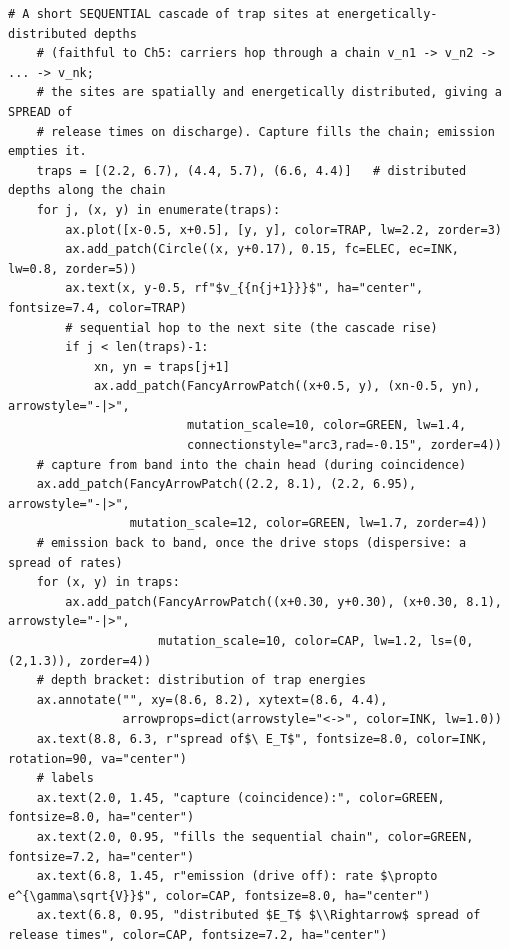 \begin{lstlisting}[caption={schematics.ipynb code cell 4},label={lst:mrl-nb-schematics-4}]
    # A short SEQUENTIAL cascade of trap sites at energetically-distributed depths
    # (faithful to Ch5: carriers hop through a chain v_n1 -> v_n2 -> ... -> v_nk;
    # the sites are spatially and energetically distributed, giving a SPREAD of
    # release times on discharge). Capture fills the chain; emission empties it.
    traps = [(2.2, 6.7), (4.4, 5.7), (6.6, 4.4)]   # distributed depths along the chain
    for j, (x, y) in enumerate(traps):
        ax.plot([x-0.5, x+0.5], [y, y], color=TRAP, lw=2.2, zorder=3)
        ax.add_patch(Circle((x, y+0.17), 0.15, fc=ELEC, ec=INK, lw=0.8, zorder=5))
        ax.text(x, y-0.5, rf"$v_{{n{j+1}}}$", ha="center", fontsize=7.4, color=TRAP)
        # sequential hop to the next site (the cascade rise)
        if j < len(traps)-1:
            xn, yn = traps[j+1]
            ax.add_patch(FancyArrowPatch((x+0.5, y), (xn-0.5, yn), arrowstyle="-|>",
                         mutation_scale=10, color=GREEN, lw=1.4,
                         connectionstyle="arc3,rad=-0.15", zorder=4))
    # capture from band into the chain head (during coincidence)
    ax.add_patch(FancyArrowPatch((2.2, 8.1), (2.2, 6.95), arrowstyle="-|>",
                 mutation_scale=12, color=GREEN, lw=1.7, zorder=4))
    # emission back to band, once the drive stops (dispersive: a spread of rates)
    for (x, y) in traps:
        ax.add_patch(FancyArrowPatch((x+0.30, y+0.30), (x+0.30, 8.1), arrowstyle="-|>",
                     mutation_scale=10, color=CAP, lw=1.2, ls=(0,(2,1.3)), zorder=4))
    # depth bracket: distribution of trap energies
    ax.annotate("", xy=(8.6, 8.2), xytext=(8.6, 4.4),
                arrowprops=dict(arrowstyle="<->", color=INK, lw=1.0))
    ax.text(8.8, 6.3, r"spread of$\ E_T$", fontsize=8.0, color=INK, rotation=90, va="center")
    # labels
    ax.text(2.0, 1.45, "capture (coincidence):", color=GREEN, fontsize=8.0, ha="center")
    ax.text(2.0, 0.95, "fills the sequential chain", color=GREEN, fontsize=7.2, ha="center")
    ax.text(6.8, 1.45, r"emission (drive off): rate $\propto e^{\gamma\sqrt{V}}$", color=CAP, fontsize=8.0, ha="center")
    ax.text(6.8, 0.95, "distributed $E_T$ $\\Rightarrow$ spread of release times", color=CAP, fontsize=7.2, ha="center")


\end{lstlisting}
